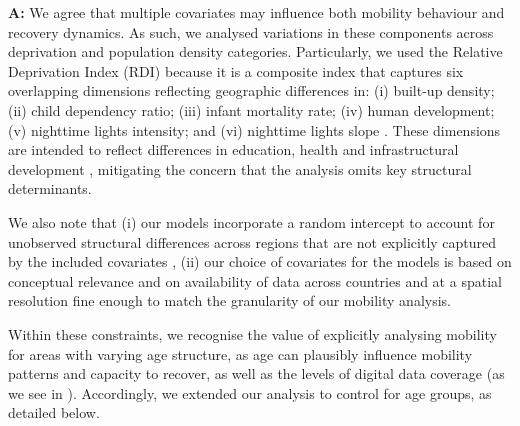 \documentclass[12pt,a4paper,oneside, reqno]{amsart}
\begin{document}
\setlength{\leftskip}{1cm}\textbf{A:} We agree that multiple covariates may influence both mobility behaviour and recovery dynamics. As such, we analysed variations in these components across deprivation and population density categories. Particularly, we used the Relative Deprivation Index (RDI) because it is a composite index that captures six overlapping dimensions reflecting geographic differences in: (i) built-up density; (ii) child dependency ratio; (iii) infant mortality rate; (iv) human development; (v) nighttime lights intensity; and (vi) nighttime lights slope \parencite{RDI2022}. These dimensions are intended to reflect differences in education, health and infrastructural development \parencite{RDI2022}, mitigating the concern that the analysis omits key structural determinants. 

We also note that (i) our models incorporate a random intercept to account for unobserved structural differences across regions that are not explicitly captured by the included covariates \parencite{gelman2007data}, (ii) our choice of covariates for the models is based on conceptual relevance and on availability of data across countries and at a spatial resolution fine enough to match the granularity of our mobility analysis. 

Within these constraints, we recognise the value of explicitly analysing mobility for areas with varying age structure, as age can plausibly influence mobility patterns \parencite{schwartz1976migration} and capacity to recover, as well as the levels of digital data coverage (as we see in \parencite{cabrera2025bias}). Accordingly, we extended our analysis to control for age groups, as detailed below.
\end{document}
